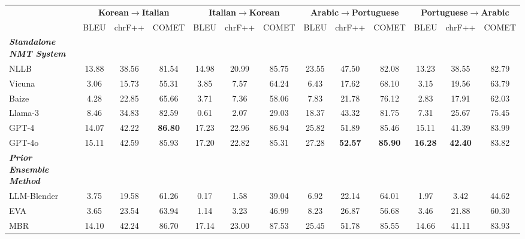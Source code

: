 \begin{table*}[t!]
\centering
\renewcommand{\arraystretch}{0.9}
\begin{adjustbox}{width=0.95\textwidth, center}
\begin{tabular}{lcccccccccccc}
\Xhline{3\arrayrulewidth}

\multirow{2}{*}{\textbf{Model}}  & \multicolumn{3}{c}{\textbf{Korean$\rightarrow$Italian}} & \multicolumn{3}{c}{\textbf{Italian$\rightarrow$Korean}} & \multicolumn{3}{c}{\textbf{Arabic$\rightarrow$Portuguese}} & \multicolumn{3}{c}{\textbf{Portuguese$\rightarrow$Arabic}}\\ \cline{2-13}
 & BLEU & chrF++ & COMET & BLEU & chrF++ & COMET  & BLEU & chrF++ & COMET & BLEU & chrF++ & COMET \\ \hline\hline 

\textit{\textbf{Standalone NMT System}}\\ \hdashline[3pt/3pt]
NLLB~\cite{nllb} & 13.88 & 38.56 & 81.54 & 14.98 & 20.99 & 85.75 & 23.55 & 47.50 & 82.08 & 13.23 & 38.55 & 82.79 \\

Vicuna~\cite{Vicuna} & 3.06 & 15.73 & 55.31 & 3.85& 7.57& 64.24 & 6.43 & 17.62 & 68.10 &3.15 & 19.56 & 63.79  \\

Baize~\cite{baize} & 4.28 & 22.85 & 65.66 &3.71 & 7.36 & 58.06 & 7.83 & 21.78 & 76.12 &2.83 & 17.91 & 62.03  \\

Llama-3~\cite{llama3modelcard} & 8.46 & 34.83 & 82.59 & 0.61 & 2.07 &  29.03 & 18.37 &  43.32 &81.75 & 7.31 & 25.67 &  75.45 \\
GPT-4~\cite{gpt4}         &          14.07 &           42.22 &            \textbf{86.80} &           17.23 &           22.96 &           86.94 &           25.82 &           51.89 &           85.46 &           15.11 &           41.39 &           83.99 \\ 
GPT-4o~\cite{gpt4o} & 15.11 & 42.59 & 85.93 & 17.20 &  22.82 & 85.31 & 27.28 & \textbf{52.57} & \textbf{85.90} & \textbf{16.28} & \textbf{42.40} & 83.82 \\
\hline

\textit{\textbf{Prior Ensemble Method}}\\ \hdashline[3pt/3pt]
LLM-Blender~\cite{llm-blender}   &           3.75 &           19.58 &           61.26 &            0.17 &            1.58 &           39.04 &            6.92 &           22.14 &           64.01 &            1.97 &            3.42 &           44.62 \\ 
EVA~\cite{eva} & 3.65 & 23.54 & 63.94 & 1.14 & 3.23 & 46.99 & 8.23 & 26.87 & 56.68 & 3.46 & 21.88 & 60.30\\ 
MBR~\cite{mbr} & 14.10 & 42.24 & 86.70 & 17.14 & 23.00 & 87.53 & 25.45 & 51.78 & 85.55 & 14.66 & 41.11 & 83.93 \\ \hline




\end{tabular}
\end{adjustbox}
\end{table*}
